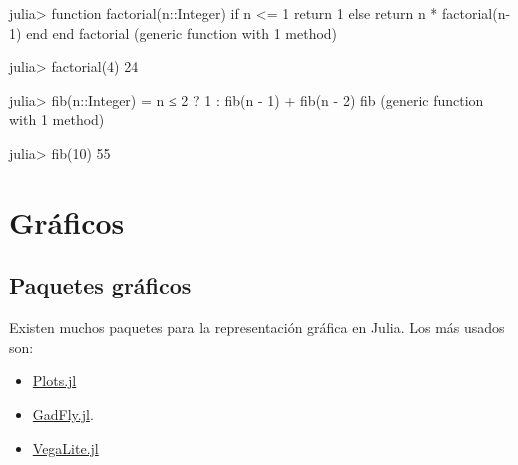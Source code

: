 \documentclass[
  letterpaper,
  DIV=11,
  numbers=noendperiod]{scrreprt}
\newenvironment{Shaded}{\begin{snugshade}}{\end{snugshade}}
\newcommand{\ControlFlowTok}[1]{\textcolor[rgb]{0.00,0.23,0.31}{#1}}
\newcommand{\DataTypeTok}[1]{\textcolor[rgb]{0.68,0.00,0.00}{#1}}
\newcommand{\FloatTok}[1]{\textcolor[rgb]{0.68,0.00,0.00}{#1}}
\newcommand{\FunctionTok}[1]{\textcolor[rgb]{0.28,0.35,0.67}{#1}}
\newcommand{\KeywordTok}[1]{\textcolor[rgb]{0.00,0.23,0.31}{#1}}
\newcommand{\NormalTok}[1]{\textcolor[rgb]{0.00,0.23,0.31}{#1}}
\newcommand{\OperatorTok}[1]{\textcolor[rgb]{0.37,0.37,0.37}{#1}}
\providecommand{\tightlist}{%
  \setlength{\itemsep}{0pt}\setlength{\parskip}{0pt}}\usepackage{longtable,booktabs,array}
\begin{document}
\begin{Shaded}
\begin{Highlighting}[]
\NormalTok{julia}\OperatorTok{\textgreater{}} \KeywordTok{function} \FunctionTok{factorial}\NormalTok{(n}\OperatorTok{::}\DataTypeTok{Integer}\NormalTok{)}
         \ControlFlowTok{if}\NormalTok{ n }\OperatorTok{\textless{}=} \FloatTok{1}
           \ControlFlowTok{return} \FloatTok{1}
         \ControlFlowTok{else}
           \ControlFlowTok{return}\NormalTok{ n }\OperatorTok{*} \FunctionTok{factorial}\NormalTok{(n}\OperatorTok{{-}}\FloatTok{1}\NormalTok{)}
         \ControlFlowTok{end}
       \KeywordTok{end}
\NormalTok{factorial (generic }\KeywordTok{function}\NormalTok{ with }\FloatTok{1}\NormalTok{ method)}

\NormalTok{julia}\OperatorTok{\textgreater{}} \FunctionTok{factorial}\NormalTok{(}\FloatTok{4}\NormalTok{)}
\FloatTok{24}

\NormalTok{julia}\OperatorTok{\textgreater{}} \FunctionTok{fib}\NormalTok{(n}\OperatorTok{::}\DataTypeTok{Integer}\NormalTok{) }\OperatorTok{=}\NormalTok{ n }\OperatorTok{≤} \FloatTok{2}\NormalTok{ ? }\FloatTok{1} \OperatorTok{:} \FunctionTok{fib}\NormalTok{(n }\OperatorTok{{-}} \FloatTok{1}\NormalTok{) }\OperatorTok{+} \FunctionTok{fib}\NormalTok{(n }\OperatorTok{{-}} \FloatTok{2}\NormalTok{)}
\NormalTok{fib (generic }\KeywordTok{function}\NormalTok{ with }\FloatTok{1}\NormalTok{ method)}

\NormalTok{julia}\OperatorTok{\textgreater{}} \FunctionTok{fib}\NormalTok{(}\FloatTok{10}\NormalTok{)}
\FloatTok{55}
\end{Highlighting}
\end{Shaded}


\hypertarget{gruxe1ficos}{%
\chapter{Gráficos}\label{gruxe1ficos}}

\hypertarget{paquetes-gruxe1ficos}{%
\section{Paquetes gráficos}\label{paquetes-gruxe1ficos}}

Existen muchos paquetes para la representación gráfica en Julia. Los más
usados son:

\begin{itemize}
\tightlist
\item
  \href{https://docs.juliaplots.org/}{Plots.jl}
\item
  \href{http://gadflyjl.org/}{GadFly.jl}.
\item
  \href{https://www.queryverse.org/VegaLite.jl/stable/}{VegaLite.jl}
\end{itemize}
\end{document}
